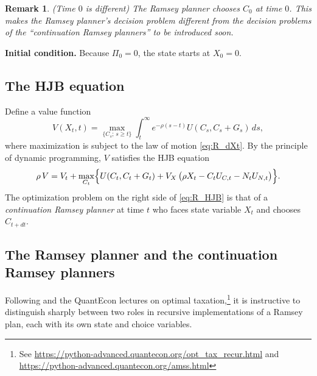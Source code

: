 \documentclass[12pt]{article}
\newtheorem{remark}{Remark}
\begin{document}
\begin{remark} (Time $0$ is different)
The Ramsey planner chooses $C_0$ at time $0$. This makes the Ramsey planner's decision problem different
from the decision problems of the ``continuation Ramsey planners'' to be introduced soon.
\end{remark}

\medskip

\noindent\textbf{Initial condition.}  Because $\Pi_0 = 0$, the state starts at
$X_0 = 0$.

\subsection{The HJB equation}

Define a value function
\begin{equation}\label{eq:R_V}
  V(X_t, t) = \max_{\{C_s;\, s \ge t\}} \int_t^\infty e^{-\rho(s-t)} U(C_s, C_s+G_s)\, ds,
\end{equation}
where maximization is
subject to the law of motion \eqref{eq:R_dXt}.  By the principle of dynamic
programming, $V$ satisfies the HJB equation
\begin{equation}\label{eq:R_HJB}
  \rho\, V = V_t + \max_{C_t}\Bigl\{U(C_t, C_t+G_t)
  + V_X\,\bigl(\rho X_t - C_t U_{C,t} - N_t U_{N,t}\bigr)\Bigr\}.
\end{equation}
The optimization problem on the right side of \eqref{eq:R_HJB} is that of a {\em continuation Ramsey planner} at time $t$ who faces state variable $X_t$ and chooses $C_{t+dt}$.

\subsection{The Ramsey planner and the continuation Ramsey planners}
\label{sub:two_ramsey_planners}

Following \citet{LucasStokey1983} and the QuantEcon lectures on optimal
taxation,\footnote{See \url{https://python-advanced.quantecon.org/opt_tax_recur.html} and \url{https://python-advanced.quantecon.org/amss.html}} it is instructive to distinguish sharply between two roles in recursive implementations of a Ramsey plan, each with its own state and choice variables.
\end{document}
